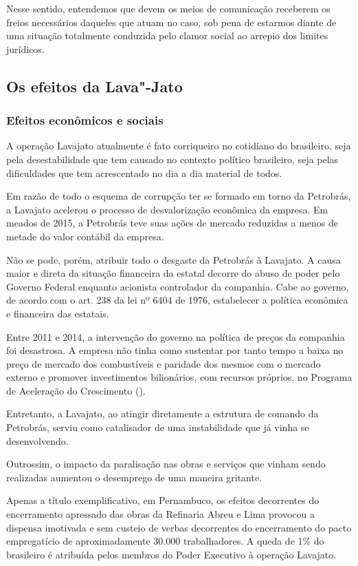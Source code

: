 Nesse sentido, entendemos que devem os meios de comunicação receberem os
freios necessários daqueles que atuam no caso, sob pena de estarmos
diante de uma situação totalmente conduzida pelo clamor social ao
arrepio dos limites jurídicos.

\subsection{Os efeitos da Lava"-Jato}

\subsubsection{Efeitos econômicos e sociais}

A operação Lavajato atualmente é fato corriqueiro no cotidiano do
brasileiro, seja pela desestabilidade que tem causado no contexto
político brasileiro, seja pelas dificuldades que tem acrescentado no dia
a dia material de todos.

Em razão de todo o esquema de corrupção ter se formado em torno da
Petrobrás, a Lavajato acelerou o processo de desvalorização econômica da
empresa. Em meados de 2015, a Petrobrás teve suas ações de mercado
reduzidas a menos de metade do valor contábil da empresa.

Não se pode, porém, atribuir todo o desgaste da Petrobrás à Lavajato. A
causa maior e direta da situação financeira da estatal decorre do abuso
de poder pelo Governo Federal enquanto acionista controlador da
companhia. Cabe ao governo, de acordo com o art. 238 da lei nº 6404 de
1976, estabelecer a política econômica e financeira das estatais.

Entre 2011 e 2014, a intervenção do governo na política de preços da
companhia foi desastrosa. A empresa não tinha como sustentar por tanto
tempo a baixa no preço de mercado dos combustíveis e paridade dos mesmos
com o mercado externo e promover investimentos bilionários, com recursos
próprios, no Programa de Aceleração do Crescimento ().

Entretanto, a Lavajato, ao atingir diretamente a estrutura de comando da
Petrobrás, serviu como catalisador de uma instabilidade que já vinha se
desenvolvendo.

Outrossim, o impacto da paralisação nas obras e serviços que vinham
sendo realizadas aumentou o desemprego de uma maneira gritante.

Apenas a título exemplificativo, em Pernambuco, os efeitos decorrentes
do encerramento apressado das obras da Refinaria Abreu e Lima provocou a
dispensa imotivada e sem custeio de verbas decorrentes do encerramento
do pacto empregatício de aproximadamente 30.000 trabalhadores. A queda
de 1\% do  brasileiro é atribuída pelos membros do Poder Executivo à
operação Lavajato.

